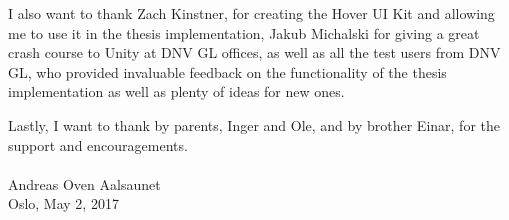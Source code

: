 I also want to thank Zach Kinstner, for creating the Hover UI Kit and allowing me to use it in the thesis implementation,  
Jakub Michalski for giving a great crash course to Unity at DNV GL offices, as well as all the test users from DNV GL, 
who provided invaluable feedback on the functionality of the thesis implementation as well as plenty of ideas for new ones.

Lastly, I want to thank by parents, Inger and Ole, and by brother Einar, for the support and encouragements. \\\\


\noindent
Andreas Oven Aalsaunet \\
Oslo, May 2, 2017






